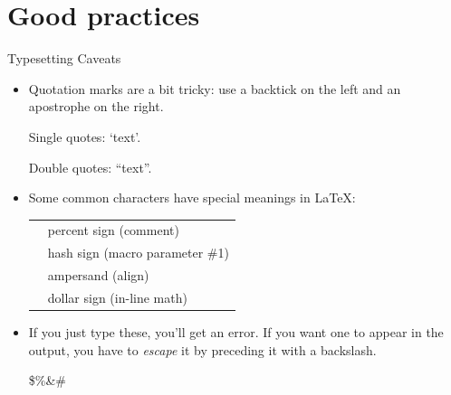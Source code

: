 \documentclass[10pt,times]{beamer}
\begin{document}
\section{Good practices}


\begin{frame}[fragile]{Typesetting Caveats}
\small
\begin{itemize}
\item Quotation marks are a bit tricky: use a backtick \keys{\`{}} on the 
left and an apostrophe \keys{\'{}} on the right.

\begin{exampletwouptiny}
Single quotes: `text'.

Double quotes: ``text''.
\end{exampletwouptiny}

\item Some common characters have special meanings in \LaTeX:\\[1ex]
\begin{tabular}{cl}
\keys{\%} & percent sign (comment)             \\
\keys{\#} & hash sign (macro parameter \#1)    \\
\keys{\&} & ampersand (align)                  \\
\keys{\$} & dollar sign (in-line math)         \\
\end{tabular}
\item If you just type these, you'll get an error. If you want one to appear in
the output, you have to \emph{escape} it by preceding it with a backslash.

\begin{exampletwoup}
\$\%\&\#
\end{exampletwoup}
\end{itemize}
\end{frame}



\end{document}
